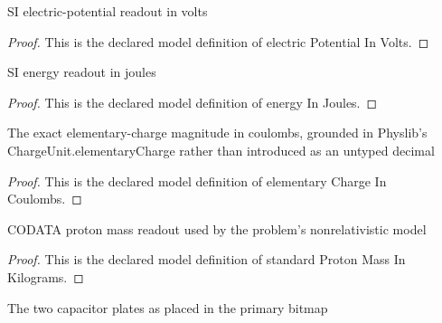 \begin{definition}
  \label{def:physics:phyx-mini-0866:phyxminiproblems-problemphyxmini0866-electricpotentialinvolts}
  SI electric-potential readout in volts
\end{definition}
\begin{proof}
  This is the declared model definition of electric Potential In Volts.
\end{proof}
\begin{definition}
  \label{def:physics:phyx-mini-0866:phyxminiproblems-problemphyxmini0866-energyinjoules}
  SI energy readout in joules
\end{definition}
\begin{proof}
  This is the declared model definition of energy In Joules.
\end{proof}
\begin{definition}
  \label{def:physics:phyx-mini-0866:phyxminiproblems-problemphyxmini0866-elementarychargeincoulombs}
  The exact elementary-charge magnitude in coulombs, grounded in Physlib's ChargeUnit.elementaryCharge rather than introduced as an untyped decimal
\end{definition}
\begin{proof}
  This is the declared model definition of elementary Charge In Coulombs.
\end{proof}
\begin{definition}
  \label{def:physics:phyx-mini-0866:phyxminiproblems-problemphyxmini0866-standardprotonmassinkilograms}
  CODATA proton mass readout used by the problem's nonrelativistic model
\end{definition}
\begin{proof}
  This is the declared model definition of standard Proton Mass In Kilograms.
\end{proof}
\begin{definition}
  \label{def:physics:phyx-mini-0866:phyxminiproblems-problemphyxmini0866-platelabel}
  The two capacitor plates as placed in the primary bitmap
\end{definition}
